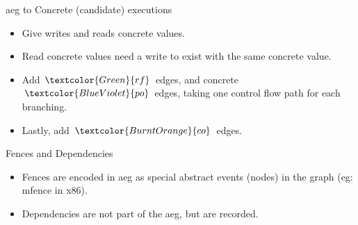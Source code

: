 \documentclass[notes, xcolor=dvipsnames]{beamer}
\newcommand{\po}{\textcolor{BlueViolet}{po}}
\newcommand{\rf}{\textcolor{Green}{rf}}
\newcommand{\co}{\textcolor{BurntOrange}{co}}
\begin{document}
    \begin{frame}{aeg to Concrete (candidate) executions}

        \begin{itemize}
            \item Give writes and reads concrete values.
            \item Read concrete values need a write to exist with the same concrete value.
            \item Add $\rf$ edges, and concrete $\po$ edges, taking one control flow path for each branching. 
            \item Lastly, add $\co$ edges.
        \end{itemize}

        \begin{figure}
        \end{figure}

        
    \end{frame}



    \begin{frame}{Fences and Dependencies}

        \begin{itemize}
            \item Fences are encoded in aeg as special abstract events (nodes) in the graph (eg: mfence in x86).
            \item Dependencies are not part of the aeg, but are recorded.
        \end{itemize}
        
    \end{frame}
\end{document}
